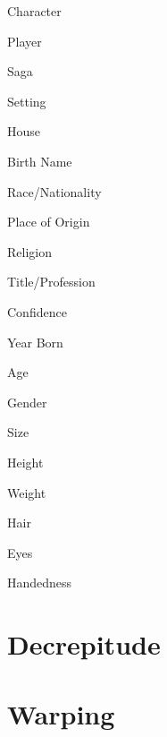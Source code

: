 \documentclass[a4paper]{article}
\begin{document}
\begin{multicols}{3}
\begin{minipage}{0.9\linewidth}
	\begin{small}
		Character\hrulefill
		
		Player\hrulefill
		
		Saga\hrulefill
		
		Setting\hrulefill
		
		House\hrulefill
				
		Birth Name\hrulefill
		
		Race/Nationality\hrulefill
		
		Place of Origin\hrulefill
		
		Religion\hrulefill
		
		Title/Profession\hrulefill
	\end{small}
\end{minipage}
\begin{minipage}{0.5\linewidth}
\begin{small}
	Confidence\hrulefill
	
	Year Born\hrulefill
	
	Age\hrulefill
	
	Gender\hrulefill
	
	Size\hrulefill
	
	Height\hrulefill
	
	Weight\hrulefill
	
	Hair\hrulefill
	
	Eyes\hrulefill
	
	Handedness\hrulefill
\end{small}
\end{minipage}
\begin{minipage}{0.3\linewidth}
\end{minipage}
\end{multicols}

\begin{multicols}{2}
	\begin{minipage}{0.5\linewidth}
		\section*{Decrepitude}
		
	\end{minipage}
	\begin{minipage}{0.4\linewidth}
		\section*{Warping}
	\end{minipage}
\end{multicols}
\end{document}
